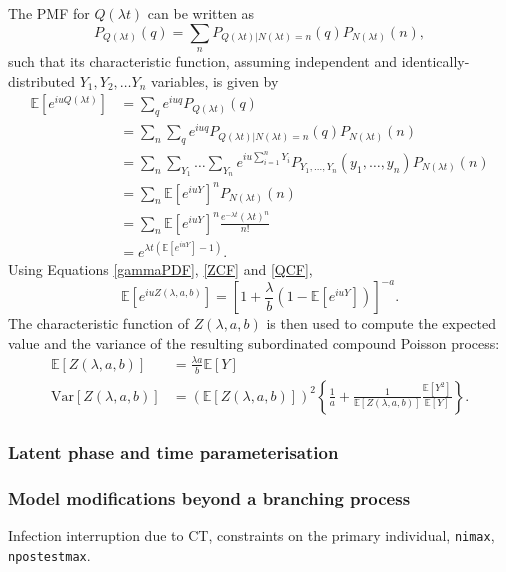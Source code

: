 \documentclass[sr]{drdc-report}
\newcommand{\ex}[1]{\mathbb{E}\left[#1\right]}
\newcommand{\var}[1]{\mathrm{Var}\left[#1\right]}
\begin{document}
The PMF for $Q(\lambda t)$ can be written as
\begin{equation}
P_{Q(\lambda t)}(q) = \sum_n P_{Q(\lambda t)|N(\lambda t)=n}(q)P_{N(\lambda t)}(n),
\end{equation}
such that its characteristic function, assuming independent and identically-dis\-tri\-bu\-ted $Y_1,Y_2,\ldots Y_n$ variables, is given by
\begin{align}
\ex{e^{iuQ(\lambda t)}} & = \sum_q e^{iuq}P_{Q(\lambda t)}(q)\nonumber\\
& = \sum_n \sum_q e^{iuq}P_{Q(\lambda t)|N(\lambda t)=n}(q)P_{N(\lambda t)}(n)\nonumber\\
& = \sum_n \sum_{Y_1}\ldots\sum_{Y_n} e^{iu\sum_{i=1}^nY_i}P_{Y_1,\ldots,Y_n}(y_1,\ldots,y_n)P_{N(\lambda t)}(n)\nonumber\\
& = \sum_n \ex{e^{iuY}}^nP_{N(\lambda t)}(n)\nonumber\\
& = \sum_n \ex{e^{iuY}}^n\frac{e^{-\lambda t}(\lambda t)^n}{n!}\nonumber\\
& = e^{\lambda t\left(\ex{e^{iuY}}-1\right)}.\label{QCF}
\end{align}
Using Equations \eqref{gammaPDF}, \eqref{ZCF} and \eqref{QCF},
\begin{equation}
\ex{e^{iuZ(\lambda,a,b)}} = \left[1+\frac{\lambda}{b}\left(1-\ex{e^{iuY}}\right)\right]^{-a}.
\end{equation}
The characteristic function of $Z(\lambda,a,b)$ is then used to compute the expected value and the variance of the resulting subordinated compound Poisson process:
\begin{align}
\ex{Z(\lambda,a,b)} & = \frac{\lambda a}{b}\ex{Y}\label{exz}\\
\var{Z(\lambda,a,b)} & = \left(\ex{Z(\lambda,a,b)}\right)^2\left\{\frac{1}{a} + \frac{1}{\ex{Z(\lambda,a,b)}}\frac{\ex{Y^2}}{\ex{Y}}\right\}.\label{exz2}
\end{align}

\subsubsection{Latent phase and time parameterisation}

\subsubsection{Model modifications beyond a branching process}
Infection interruption due to CT, constraints on the primary individual, \texttt{nimax}, \texttt{npostestmax}.
\end{document}

